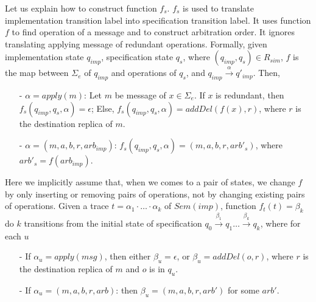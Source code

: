 Let us explain how to construct function $f_s$. $f_s$ is used to translate implementation transition label into specification transition label. It uses function $f$ to find operation of a message and to construct arbitration order. It ignores translating applying message of redundant operations. Formally, given implementation state $q_{\mathit{imp}}$, specification state $q_s$, where $(q_{\mathit{imp}},q_s) \in R_{\mathit{sim}}$, $f$ is the map between $\Sigma_e$ of $q_{\mathit{imp}}$ and operations of $q_s$, and $q_{\mathit{imp}} {\xrightarrow{\alpha}} q'_{\mathit{imp}}$. Then,

\begin{itemize}
\setlength{\itemsep}{0.5pt}
\item[-] $\alpha = apply(m)$: Let $m$ be message of $x \in \Sigma_e$. If $x$ is redundant, then $f_s(q_{\mathit{imp}},q_s,\alpha) = \epsilon$; Else, $f_s(q_{\mathit{imp}},q_s,\alpha) = addDel(f(x),r)$, where $r$ is the destination replica of $m$.

\item[-] $\alpha = (m,a,b,r,\mathit{arb}_{\mathit{imp}})$: $f_s(q_{\mathit{imp}},q_s,\alpha) = (m,a,b,r,\mathit{arb}'_s)$, where $\mathit{arb}'_s = f( \mathit{arb}_{\mathit{imp}} )$. 
\end{itemize}

Here we implicitly assume that, when we comes to a pair of states, we change $f$ by only inserting or removing pairs of operations, not by changing existing pairs of operations. Given a trace $t = \alpha_1 \cdot \ldots \cdot \alpha_k$ of $\mathit{Sem}(\mathit{imp})$, function $f_t(t) = \beta_k$ do $k$ transitions from the initial state of specification $q_0 {\xrightarrow{\beta_1}} q_1 \ldots {\xrightarrow{\beta_k}} q_k$, where for each $u$

\begin{itemize}
\setlength{\itemsep}{0.5pt}
\item[-] If $\alpha_u = \mathit{apply}(\mathit{msg})$, then either $\beta_u = \epsilon$, or $\beta_u = \mathit{addDel}(o,r)$, where $r$ is the destination replica of $\mathit{m}$ and $o$ is in $q_u$.   

\item[-] If $\alpha_u = (m,a,b,r,\mathit{arb})$: then $\beta_u =  (m,a,b,r,\mathit{arb}')$ for some $\mathit{arb}'$. 
\end{itemize}





